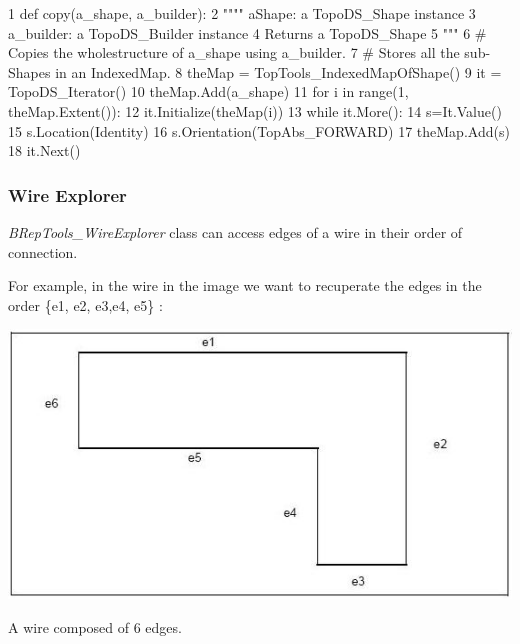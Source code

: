 \begin{DoxyCode}
1 \textcolor{keyword}{def }copy(a\_shape, a\_builder):
2  \textcolor{stringliteral}{"""" aShape: a TopoDS\_Shape instance}
3 \textcolor{stringliteral}{ a\_builder: a TopoDS\_Builder instance}
4 \textcolor{stringliteral}{ Returns a TopoDS\_Shape}
5 \textcolor{stringliteral}{ """}
6  \textcolor{comment}{# Copies the wholestructure of a\_shape using a\_builder. }
7  \textcolor{comment}{# Stores all the sub-Shapes in an IndexedMap. }
8  theMap = TopTools\_IndexedMapOfShape()
9  it = TopoDS\_Iterator()
10  theMap.Add(a\_shape)
11  \textcolor{keywordflow}{for} i \textcolor{keywordflow}{in} range(1, theMap.Extent()):
12   it.Initialize(theMap(i))
13   \textcolor{keywordflow}{while} it.More():
14     s=It.Value()
15     s.Location(Identity)
16     s.Orientation(TopAbs\_FORWARD)
17     theMap.Add(s) 
18     it.Next()
\end{DoxyCode}
\hypertarget{occt_user_guides__modeling_data_occt_modat_5_5_1}{}\subsubsection{Wire Explorer}\label{occt_user_guides__modeling_data_occt_modat_5_5_1}
{\itshape B\+Rep\+Tools\+\_\+\+Wire\+Explorer} class can access edges of a wire in their order of connection.

For example, in the wire in the image we want to recuperate the edges in the order \{e1, e2, e3,e4, e5\} \+:


\begin{DoxyImage}
\begin{center}
 \includegraphics[width=\textwidth,height=\textheight/2,keepaspectratio=true]{modeling_data_image014.png}
\end{center}
\caption{A wire composed of 6 edges.}
\end{DoxyImage}


